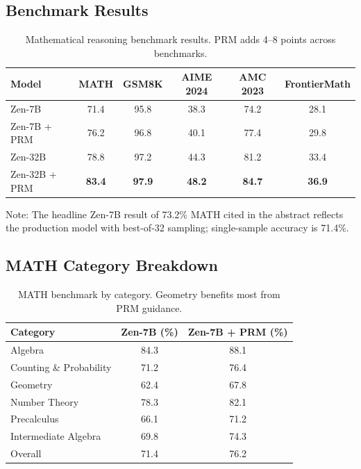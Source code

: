 \documentclass[11pt,a4paper]{article}
\begin{document}
\subsection{Benchmark Results}

\begin{table}[H]
\centering
\begin{tabular}{lccccc}
\toprule
\textbf{Model} & \textbf{MATH} & \textbf{GSM8K} & \textbf{AIME 2024} & \textbf{AMC 2023} & \textbf{FrontierMath} \\
\midrule
Zen-7B & 71.4 & 95.8 & 38.3 & 74.2 & 28.1 \\
Zen-7B + PRM & 76.2 & 96.8 & 40.1 & 77.4 & 29.8 \\
Zen-32B & 78.8 & 97.2 & 44.3 & 81.2 & 33.4 \\
Zen-32B + PRM & \textbf{83.4} & \textbf{97.9} & \textbf{48.2} & \textbf{84.7} & \textbf{36.9} \\
\bottomrule
\end{tabular}
\caption{Mathematical reasoning benchmark results. PRM adds 4--8 points across benchmarks.}
\end{table}

Note: The headline Zen-7B result of 73.2\% MATH cited in the abstract reflects the
production model with best-of-32 sampling; single-sample accuracy is 71.4\%.

\subsection{MATH Category Breakdown}

\begin{table}[H]
\centering
\begin{tabular}{lcc}
\toprule
\textbf{Category} & \textbf{Zen-7B (\%)} & \textbf{Zen-7B + PRM (\%)} \\
\midrule
Algebra & 84.3 & 88.1 \\
Counting \& Probability & 71.2 & 76.4 \\
Geometry & 62.4 & 67.8 \\
Number Theory & 78.3 & 82.1 \\
Precalculus & 66.1 & 71.2 \\
Intermediate Algebra & 69.8 & 74.3 \\
\midrule
Overall & 71.4 & 76.2 \\
\bottomrule
\end{tabular}
\caption{MATH benchmark by category. Geometry benefits most from PRM guidance.}
\end{table}
\end{document}
